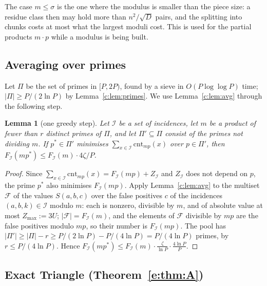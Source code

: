 \documentclass[11pt]{article}
\newtheorem{lemma}[theorem]{Lemma}
\theoremstyle{definition}
\theoremstyle{remark}
\newcommand{\cnt}{\mathrm{cnt}}
\newcommand{\Iq}{\mathcal{I}}
\begin{document}
The case $m\le\sigma$ is the one where the modulus is smaller than the piece size: a residue class then may hold more than $n^2/\sqrt D$ pairs, and the splitting into chunks costs at most what the largest moduli cost. This is used for the partial products $m\cdot p$ while a modulus is being built.

\subsection{Averaging over primes}\label{e:sec:avg}

Let $\Pi$ be the set of primes in $[P,2P)$, found by a sieve in $O(P\log\log P)$ time; $|\Pi|\ge P/(2\ln P)$ by Lemma~\ref{c:lem:primes}. We use Lemma~\ref{c:lem:avg} through the following step.

\begin{lemma}[one greedy step]\label{e:lem:step}
Let $\Iq$ be a set of incidences, let $m$ be a product of fewer than $r$ distinct primes of $\Pi$, and let $\Pi'\subseteq\Pi$ consist of the primes not dividing $m$. If $p^*\in\Pi'$ minimises $\sum_{x\in\Iq}\cnt_{mp}(x)$ over $p\in\Pi'$, then $F_\Iq(mp^*)\le F_\Iq(m)\cdot4\zeta/P$.
\end{lemma}
\begin{proof}
Since $\sum_{x\in\Iq}\cnt_{mp}(x)=F_\Iq(mp)+Z_\Iq$ and $Z_\Iq$ does not depend on $p$, the prime $p^*$ also minimises $F_\Iq(mp)$. Apply Lemma~\ref{c:lem:avg} to the multiset $\mathcal F$ of the values $S(a,b,c)$ over the false positives $c$ of the incidences $(a,b,k)\in\Iq$ modulo $m$: each is nonzero, divisible by $m$, and of absolute value at most $Z_{\max}:=3U$; $|\mathcal F|=F_\Iq(m)$, and the elements of $\mathcal F$ divisible by $mp$ are the false positives modulo $mp$, so their number is $F_\Iq(mp)$. The pool has $|\Pi'|\ge|\Pi|-r\ge P/(2\ln P)-P/(4\ln P)=P/(4\ln P)$ primes, by $r\le P/(4\ln P)$. Hence $F_\Iq(mp^*)\le F_\Iq(m)\cdot\frac{\zeta}{\ln P}\cdot\frac{4\ln P}{P}$.
\end{proof}

\subsection{Exact Triangle (Theorem~\ref{e:thm:A})}\label{e:sec:detection}
\end{document}
